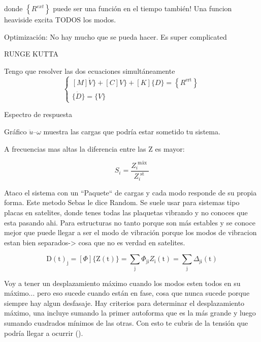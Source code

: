 \documentclass[draft,11pt, a4paper,titlepage]{article}
\begin{document}
donde $\left\{ R^{e x t}\right\}$ puede ser una función en el tiempo también! Una funcion heaviside excita TODOS los modos.

Optimización: No hay mucho que se pueda hacer. Es super complicated

RUNGE KUTTA

Tengo que resolver las dos ecuaciones simultáneamente
\[
\left\{\begin{array}{l}{[M] \dot{V} \}+[C] V \}+[K]\{D\}=\left\{R^{\text {ert}}\right\}} \\ {\{\dot{D}\}=\{V\}}\end{array}\right.
\]

Espectro de respuesta


Gráfico $\ddot{u}$--$\omega$ muestra las cargas que podría estar sometido tu sistema.

A frecuencias mas altas la diferencia entre las Z es mayor:

\[
S_{i}=\frac{Z_{i}^{\text { mâx }}}{Z_{i}^{\text { st }}}
\]

Ataco el sistema con un ``Paquete`` de cargas y cada modo responde de su propia forma. Este metodo Sebas le dice Random. Se suele usar para sistemas tipo placas en satelites, donde tenes todas las plaquetas vibrando y no conoces que esta pasando ahi. Para estructuras no tanto porque son más estables y se conoce mejor que puede llegar a ser el modo de vibración porque los modos de vibracion estan bien separados-> cosa que no es verdad en satelites. 

\[
\mathrm{D}(\mathrm{t})_{\mathrm{j}}=[\Phi]\{\mathrm{Z}(\mathrm{t})\}=\sum_{\mathrm{j}} \Phi_{\mathrm{ji}} Z_{\mathrm{i}}(\mathrm{t})=\sum_{\mathrm{j}} \Delta_{\mathrm{ji}}(\mathrm{t})
\]



Voy a tener un desplazamiento máximo cuando los modos esten todos en su máximo... pero eso sucede cuando están en fase, cosa que nunca sucede porque siempre hay algun desfasaje. Hay criterios para determinar el desplazamiento máximo, una incluye sumando la primer autoforma que es la más grande y luego sumando cuadrados mínimos de las otras. Con esto te cubris de la tensión que podría llegar a ocurrir (). 
%
\end{document}
